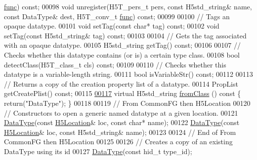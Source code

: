 \begin{DoxyCode}
      \hyperlink{structfunc}{func}) \textcolor{keyword}{const};
00098         \textcolor{keywordtype}{void} unregister(H5T\_pers\_t pers, \textcolor{keyword}{const} H5std\_string& name, \textcolor{keyword}{const} DataType& dest, H5T\_conv\_t 
      \hyperlink{structfunc}{func}) \textcolor{keyword}{const};
00099 
00100         \textcolor{comment}{// Tags an opaque datatype.}
00101         \textcolor{keywordtype}{void} setTag(\textcolor{keyword}{const} \textcolor{keywordtype}{char}* tag) \textcolor{keyword}{const};
00102         \textcolor{keywordtype}{void} setTag(\textcolor{keyword}{const} H5std\_string& tag) \textcolor{keyword}{const};
00103 
00104         \textcolor{comment}{// Gets the tag associated with an opaque datatype.}
00105         H5std\_string getTag() \textcolor{keyword}{const};
00106 
00107         \textcolor{comment}{// Checks whether this datatype contains (or is) a certain type class.}
00108         \textcolor{keywordtype}{bool} detectClass(H5T\_class\_t cls) \textcolor{keyword}{const};
00109 
00110         \textcolor{comment}{// Checks whether this datatype is a variable-length string.}
00111         \textcolor{keywordtype}{bool} isVariableStr() \textcolor{keyword}{const};
00112 
00113         \textcolor{comment}{// Returns a copy of the creation property list of a datatype.}
00114         PropList getCreatePlist() \textcolor{keyword}{const};
00115 
\hyperlink{class_h5_1_1_data_type_a54398643ff3dd5df349ab749192a2914}{00117}         \textcolor{keyword}{virtual} H5std\_string \hyperlink{class_h5_1_1_data_type_a54398643ff3dd5df349ab749192a2914}{fromClass} ()\textcolor{keyword}{ const }\{ \textcolor{keywordflow}{return}(\textcolor{stringliteral}{"DataType"}); \}
00118 
00119 \textcolor{comment}{// From CommonFG then H5Location}
00120         \textcolor{comment}{// Constructors to open a generic named datatype at a given location.}
00121         \hyperlink{class_h5_1_1_data_type}{DataType}(\textcolor{keyword}{const} \hyperlink{class_h5_1_1_h5_location}{H5Location}& loc, \textcolor{keyword}{const} \textcolor{keywordtype}{char}* name);
00122         \hyperlink{class_h5_1_1_data_type}{DataType}(\textcolor{keyword}{const} \hyperlink{class_h5_1_1_h5_location}{H5Location}& loc, \textcolor{keyword}{const} H5std\_string& name);
00123 
00124 \textcolor{comment}{// End of From CommonFG then H5Location}
00125 
00126         \textcolor{comment}{// Creates a copy of an existing DataType using its id}
00127         \hyperlink{class_h5_1_1_data_type}{DataType}(\textcolor{keyword}{const} hid\_t type\_id);

\end{DoxyCode}

